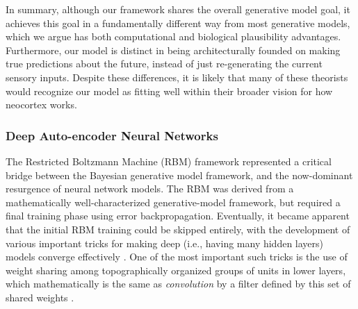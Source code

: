 \documentclass[11pt,twoside]{article}
\newif\myifpdf
\begin{document}
In summary, although our framework shares the overall generative model goal, it achieves this goal in a fundamentally different way from most generative models, which we argue has both computational and biological plausibility advantages.   Furthermore, our model is distinct in being architecturally founded on making true predictions about the future, instead of just re-generating the current sensory inputs.  Despite these differences, it is likely that many of these theorists would recognize our model as fitting well within their broader vision for how neocortex works.

\subsubsection{Deep Auto-encoder Neural Networks}

The Restricted Boltzmann Machine (RBM) framework \cite{Hinton02,HintonSalakhutdinov06,Hinton07a} represented a critical bridge between the Bayesian generative model framework, and the now-dominant resurgence of neural network models.  The RBM was derived from a mathematically well-characterized generative-model framework, but required a final training phase using error backpropagation.  Eventually, it became apparent that the initial RBM training could be skipped entirely, with the development of various important tricks for making deep (i.e., having many hidden layers) models converge effectively \cite{CiresanMeierGambardellaEtAl10,CiresanMeierSchmidhuber12,KrizhevskySutskeverHinton12,BengioCourvilleVincent13,LeCunBengioHinton15}.  One of the most important such tricks is the use of weight sharing among topographically organized groups of units in lower layers, which mathematically is the same as {\em convolution} by a filter defined by this set of shared weights \cite{LeCunBoserDenkerEtAl90,LeCunBengioHinton15}.
\end{document}

